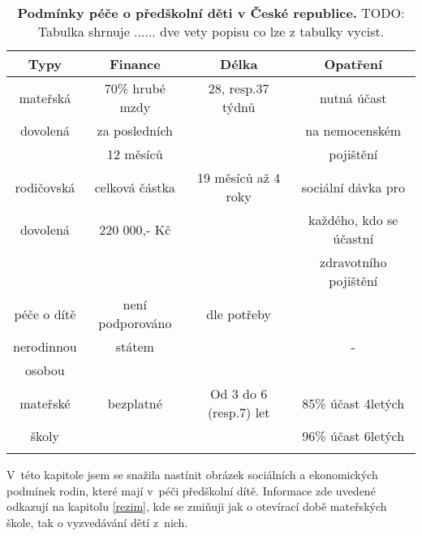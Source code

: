 \begin{spacing}{1.0}
\begin{table}[h]
	\small
	\begin{center}
	\begin{tabular}{|c|c|c|c|}
		\hline
		\rowcolor{grey}
		\textbf{Typy}	 & \textbf{Finance}		& \textbf{Délka}		& \textbf{Opatření}	 \\
		\hline
		\hline
		mateřská & 70\% hrubé mzdy 			& 28, resp.37 týdnů		& nutná účast  			\\ \rowcolor{grey!10}
		dovolená & za posledních	 		& 						& na nemocenském 		\\ \rowcolor{grey!10}
				 & 12 měsíců				& 						& pojištění				\\ \rowcolor{grey!10}
		\hline
		rodičovská 	& celková částka  		& 19 měsíců až 4 roky	& sociální dávka pro 	\\ \rowcolor{grey!10}
		dovolená 	& 220 000,- Kč			& 					& každého, kdo se účastní	\\ \rowcolor{grey!10}
					&						&						& zdravotního pojištění \\ \rowcolor{grey!10}
		\hline
		péče o dítě & není podporováno		& dle potřeby			&   					\\ \rowcolor{grey!10}
		nerodinnou	& státem				&						&	-					\\ \rowcolor{grey!10}
		osobou 		&						&						&						\\ \rowcolor{grey!10}
		\hline
		mateřské	& 	bezplatné 			& Od 3 do 6 (resp.7) let & 85\% účast 4letých 	\\ \rowcolor{grey!10}
		školy 		& 						&  						 & 96\% účast 6letých 	\\ \rowcolor{grey!10}
		\hline
	\end{tabular}
	\end{center}
	\label{tab:peceCR}
	\caption{
		\textbf{Podmínky péče o předškolní děti v České republice.}
		TODO: Tabulka shrnuje ...... dve vety popisu co lze z tabulky vycist.
	}
\end{table}
\end{spacing}

				V této kapitole jsem se snažila nastínit obrázek sociálních a ekonomických podmínek rodin, které mají v péči předškolní dítě. Informace zde uvedené odkazují na kapitolu \ref{rezim}, kde se zmiňuji jak o otevírací době mateřských škole, tak o vyzvedávání dětí z nich. 

